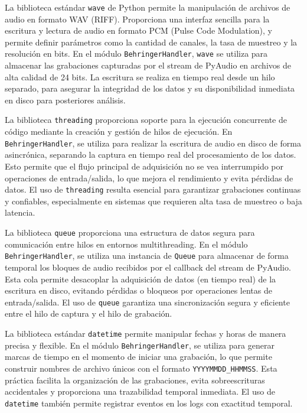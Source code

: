 La biblioteca estándar \texttt{wave} de Python permite la manipulación de archivos de audio en formato WAV (RIFF). Proporciona una interfaz sencilla para la escritura y lectura de audio en formato PCM (Pulse Code Modulation), y permite definir parámetros como la cantidad de canales, la tasa de muestreo y la resolución en bits. En el módulo \texttt{BehringerHandler}, \texttt{wave} se utiliza para almacenar las grabaciones capturadas por el stream de PyAudio en archivos de alta calidad de 24 bits. La escritura se realiza en tiempo real desde un hilo separado, para asegurar la integridad de los datos y su disponibilidad inmediata en disco para posteriores análisis.

La biblioteca \texttt{threading} proporciona soporte para la ejecución concurrente de código mediante la creación y gestión de hilos de ejecución. En \texttt{BehringerHandler}, se utiliza para realizar la escritura de audio en disco de forma asincrónica, separando la captura en tiempo real del procesamiento de los datos. Esto permite que el flujo principal de adquisición no se vea interrumpido por operaciones de entrada/salida, lo que mejora el rendimiento y evita pérdidas de datos. El uso de \texttt{threading} resulta esencial para garantizar grabaciones continuas y confiables, especialmente en sistemas que requieren alta tasa de muestreo o baja latencia.

La biblioteca \texttt{queue} proporciona una estructura de datos segura para comunicación entre hilos en entornos multithreading. En el módulo \texttt{BehringerHandler}, se utiliza una instancia de \texttt{Queue} para almacenar de forma temporal los bloques de audio recibidos por el callback del stream de PyAudio. Esta cola permite desacoplar la adquisición de datos (en tiempo real) de la escritura en disco, evitando pérdidas o bloqueos por operaciones lentas de entrada/salida. El uso de \texttt{queue} garantiza una sincronización segura y eficiente entre el hilo de captura y el hilo de grabación.

La biblioteca estándar \texttt{datetime} permite manipular fechas y horas de manera precisa y flexible. En el módulo  \texttt{BehringerHandler}, se utiliza para generar marcas de tiempo en el momento de iniciar una grabación, lo que permite construir nombres de archivo únicos con el formato \texttt{YYYYMMDD\_HHMMSS}. Esta práctica facilita la organización de las grabaciones, evita sobreescrituras accidentales y proporciona una trazabilidad temporal inmediata. El uso de \texttt{datetime} también permite registrar eventos en los logs con exactitud temporal.

